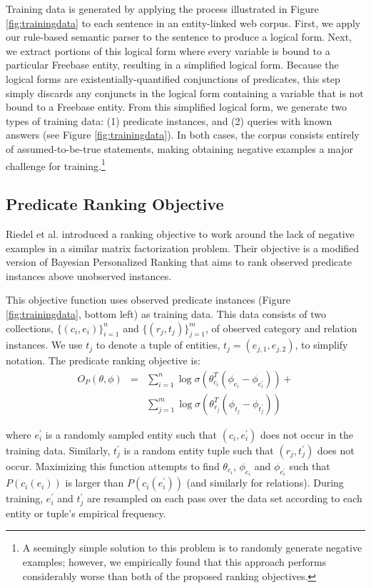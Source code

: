 \documentclass[11pt]{article}
\begin{document}
Training data is generated by applying the process illustrated in
Figure \ref{fig:trainingdata} to each sentence in an entity-linked web
corpus. First, we apply our rule-based semantic parser to the sentence
to produce a logical form. Next, we extract portions of this logical
form where every variable is bound to a particular Freebase entity,
resulting in a simplified logical form. Because the logical forms are
existentially-quantified conjunctions of predicates, this step simply
discards any conjuncts in the logical form containing a variable that
is not bound to a Freebase entity. From this simplified logical form,
we generate two types of training data: (1) predicate instances, and
(2) queries with known answers (see Figure \ref{fig:trainingdata}). In
both cases, the corpus consists entirely of assumed-to-be-true
statements, making obtaining negative examples a major challenge for
training.\footnote{A seemingly simple solution to this problem is to
  randomly generate negative examples; however, we empirically found
  that this approach performs considerably worse than both of the
  proposed ranking objectives.}

\subsection{Predicate Ranking Objective}
\label{sec:pro}

Riedel et al.  introduced a ranking objective to
work around the lack of negative examples in a similar matrix
factorization problem. Their objective is a modified version of
Bayesian Personalized Ranking \cite{rendle2009} that aims to rank
observed predicate instances above unobserved instances.

This objective function uses observed predicate instances (Figure
\ref{fig:trainingdata}, bottom left) as training data. This data
consists of two collections, $\{(c_i, e_i)\}_{i=1}^n$ and $\{(r_j,
t_j)\}_{j=1}^m$, of observed category and relation instances. We use
$t_j$ to denote a tuple of entities, $t_j = (e_{j,1}, e_{j,2})$, to
simplify notation. The predicate ranking objective is:
\begin{eqnarray*}
O_P(\theta, \phi) & = & \sum_{i=1}^n \log \sigma( \theta_{c_i}^T (\phi_{e_i} - \phi_{e_i^\prime})) + \\
& & \sum_{j=1}^m \log \sigma( \theta_{r_j}^T (\phi_{t_j} - \phi_{t_j^\prime}))
\end{eqnarray*}

where $e_i^\prime$ is a randomly sampled entity such that $(c_i,
e_i^\prime)$ does not occur in the training data. Similarly,
$t_j^\prime$ is a random entity tuple such that $(r_j, t_j^\prime)$
does not occur. Maximizing this function attempts to find
$\theta_{c_i}$, $\phi_{e_i}$ and $\phi_{e_i^\prime}$ such that
$P(c_i(e_i))$ is larger than $P(c_i(e_i^\prime))$ (and similarly for
relations). During training, $e_i^\prime$ and $t_j^\prime$ are
resampled on each pass over the data set according to each entity or
tuple's empirical frequency.
\end{document}
